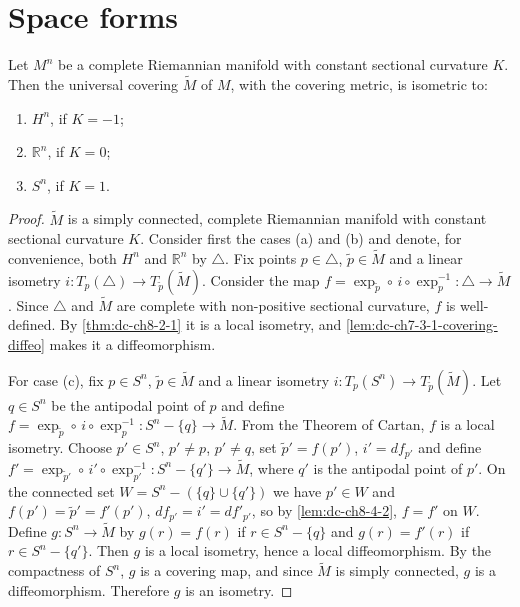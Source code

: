 \section{Space forms}

\begin{theorem}
  \label{thm:dc-ch8-4-1}
  \notready
  Let $M^n$ be a complete Riemannian manifold with constant sectional curvature $K$.
  Then the universal covering $\tilde{M}$ of $M$, with the covering metric, is
  isometric to:
  \begin{enumerate}
    \item[(a)] $H^n$, if $K=-1$;
    \item[(b)] $\mathbb{R}^n$, if $K=0$;
    \item[(c)] $S^n$, if $K=1$.
  \end{enumerate}
\end{theorem}
\begin{proof}
\sketch
  $\tilde{M}$ is a simply connected, complete Riemannian
  manifold with constant sectional curvature $K$. Consider first the cases (a) and
  (b) and denote, for convenience, both $H^n$ and $\mathbb{R}^n$ by $\triangle$. Fix
  points $p\in\triangle$, $\tilde{p}\in\tilde{M}$ and a linear isometry
  $i:T_p(\triangle)\to T_{\tilde{p}}(\tilde{M})$. Consider the map
  $f=\exp_{\tilde{p}}\circ\,i\circ\exp_p^{-1}:\triangle\to\tilde{M}$. Since $\triangle$
  and $\tilde{M}$ are complete with non-positive sectional curvature, $f$ is
  well-defined. By \cref{thm:dc-ch8-2-1} it is a local isometry, and
  \cref{lem:dc-ch7-3-1-covering-diffeo} makes it a diffeomorphism.

  For case (c), fix $p\in S^n$, $\tilde{p}\in\tilde{M}$ and a linear isometry
  $i:T_p(S^n)\to T_{\tilde{p}}(\tilde{M})$. Let $q\in S^n$ be the antipodal point of
  $p$ and define $f=\exp_{\tilde{p}}\circ\,i\circ\exp_p^{-1}:S^n-\{q\}\to\tilde{M}$.
  From the Theorem of Cartan, $f$ is a local isometry. Choose $p'\in S^n$,
  $p'\neq p$, $p'\neq q$, set $\tilde{p}'=f(p')$, $i'=df_{p'}$ and define
  $f'=\exp_{\tilde{p}'}\circ\,i'\circ\exp_{p'}^{-1}:S^n-\{q'\}\to\tilde{M}$, where
  $q'$ is the antipodal point of $p'$. On the connected set
  $W=S^n-(\{q\}\cup\{q'\})$ we have $p'\in W$ and $f(p')=\tilde{p}'=f'(p')$,
  $df_{p'}=i'=df'_{p'}$, so by \cref{lem:dc-ch8-4-2}, $f=f'$ on $W$. Define
  $g:S^n\to\tilde{M}$ by $g(r)=f(r)$ if $r\in S^n-\{q\}$ and $g(r)=f'(r)$ if
  $r\in S^n-\{q'\}$. Then $g$ is a local isometry, hence a local diffeomorphism. By
  the compactness of $S^n$, $g$ is a covering map, and since $\tilde{M}$ is simply
  connected, $g$ is a diffeomorphism. Therefore $g$ is an isometry.
\end{proof}

